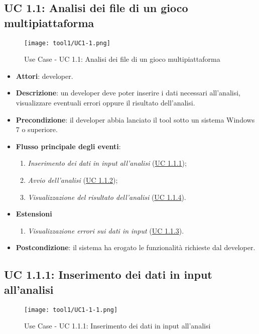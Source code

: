 	\subsection{UC 1.1: Analisi dei file di un gioco multipiattaforma}
		\label{subsec:UC1.1}
		
		\begin{figure}[!h] 
			\centering 
			\texttt{[image: tool1/UC1-1.png]} 
			\caption{Use Case - UC 1.1: Analisi dei file di un gioco multipiattaforma}
		\end{figure}
		
		\begin{itemize}
			\item\textbf{Attori}: developer.
			\item\textbf{Descrizione}: un developer deve poter inserire i dati necessari all'analisi, visualizzare eventuali errori oppure il risultato dell'analisi.
			\item\textbf{Precondizione}: il developer abbia lanciato il tool sotto un sistema Windows 7 o superiore.
			\item\textbf{Flusso principale degli eventi}: 
			\begin{enumerate}
				\item\textit{Inserimento dei dati in input all'analisi} (\hyperref[subsec:UC1.1.1]{UC 1.1.1});
				\item\textit{Avvio dell'analisi} (\hyperref[subsec:UC1.1.2]{UC 1.1.2});
				\item\textit{Visualizzazione del risultato dell'analisi} (\hyperref[subsec:UC1.1.4]{UC 1.1.4}).
			\end{enumerate}
			\item \textbf{Estensioni}
			\begin{enumerate}
				\item\textit{Visualizzazione errori sui dati in input} (\hyperref[subsec:UC1.1.3]{UC 1.1.3}).
			\end{enumerate}
			\item\textbf{Postcondizione}: il sistema ha erogato le funzionalità richieste dal developer.
		\end{itemize}
	
	\subsection{UC 1.1.1: Inserimento dei dati in input all'analisi}
		\label{subsec:UC1.1.1}
		
		\begin{figure}[!h] 
			\centering 
			\texttt{[image: tool1/UC1-1-1.png]} 
			\caption{Use Case - UC 1.1.1: Inserimento dei dati in input all'analisi}
		\end{figure}
		
